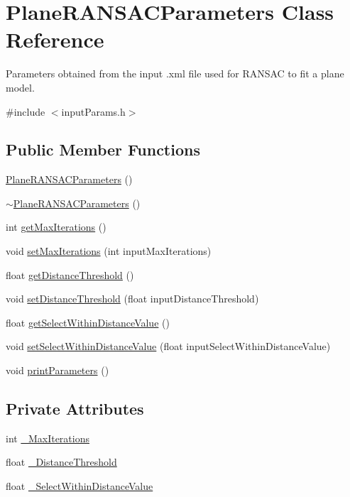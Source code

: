 \hypertarget{classPlaneRANSACParameters}{\section{Plane\-R\-A\-N\-S\-A\-C\-Parameters Class Reference}
\label{classPlaneRANSACParameters}
}


Parameters obtained from the input .xml file used for R\-A\-N\-S\-A\-C to fit a plane model.  




{\ttfamily \#include $<$input\-Params.\-h$>$}

\subsection*{Public Member Functions}
\begin{DoxyCompactItemize}
\item 
\hyperlink{classPlaneRANSACParameters_a587c2ace84c104935cec90a3afa9de24}{Plane\-R\-A\-N\-S\-A\-C\-Parameters} ()
\item 
\hyperlink{classPlaneRANSACParameters_ae24dde173dde3dd5bd0c95db9f269531}{$\sim$\-Plane\-R\-A\-N\-S\-A\-C\-Parameters} ()
\item 
int \hyperlink{classPlaneRANSACParameters_a19537dafa63cf7c599148444558af622}{get\-Max\-Iterations} ()
\item 
void \hyperlink{classPlaneRANSACParameters_a628b28c73c8212bd672cd99d009433b4}{set\-Max\-Iterations} (int input\-Max\-Iterations)
\item 
float \hyperlink{classPlaneRANSACParameters_a895afbdfd67f481e6916a4efc14087ec}{get\-Distance\-Threshold} ()
\item 
void \hyperlink{classPlaneRANSACParameters_a4f17f22cc270134f082ebddf6e18489c}{set\-Distance\-Threshold} (float input\-Distance\-Threshold)
\item 
float \hyperlink{classPlaneRANSACParameters_a6b447bec124320caee0d302dc0d5a907}{get\-Select\-Within\-Distance\-Value} ()
\item 
void \hyperlink{classPlaneRANSACParameters_aebef5d38cb7383635f5bd7f02a651246}{set\-Select\-Within\-Distance\-Value} (float input\-Select\-Within\-Distance\-Value)
\item 
void \hyperlink{classPlaneRANSACParameters_a6a7539e3a1687535edd8e0f5e618a1ba}{print\-Parameters} ()
\end{DoxyCompactItemize}
\subsection*{Private Attributes}
\begin{DoxyCompactItemize}
\item 
int \hyperlink{classPlaneRANSACParameters_a39d98b888f629b455b35365991d303ab}{\-\_\-\-Max\-Iterations}
\item 
float \hyperlink{classPlaneRANSACParameters_a2f3a7aba4f478cb3eb9a97866b96f9fd}{\-\_\-\-Distance\-Threshold}
\item 
float \hyperlink{classPlaneRANSACParameters_a8e68f5852309a371af04f221a6e3ac7c}{\-\_\-\-Select\-Within\-Distance\-Value}
\end{DoxyCompactItemize}


